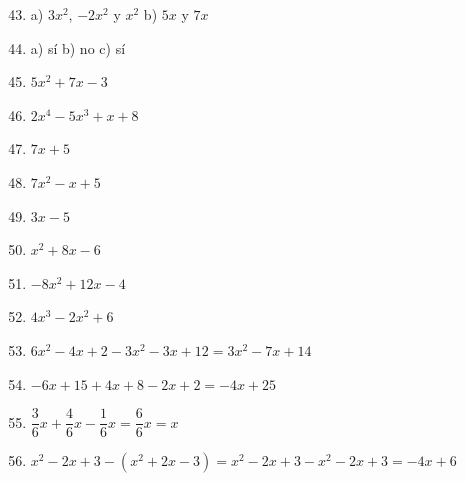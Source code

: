 \documentclass[12pt, letterpaper]{article}
\begin{document}
  \begin{enumerate}[leftmargin=*, label=\textbf{\arabic*.}]
    \setcounter{enumi}{42}
    \item a) $3x^2$, $-2x^2$ y $x^2$ \quad b) $5x$ y $7x$

    \item a) sí \quad b) no \quad c) sí

    \item $5x^2 + 7x - 3$

    \item $2x^4 - 5x^3 + x + 8$

    \item $7x + 5$

    \item $7x^2 - x + 5$

    \item $3x - 5$

    \item $x^2 + 8x - 6$

    \item $-8x^2 + 12x - 4$

    \item $4x^3 - 2x^2 + 6$

    \item $6x^2 - 4x + 2 - 3x^2 - 3x + 12 = 3x^2 - 7x + 14$

    \item $-6x + 15 + 4x + 8 - 2x + 2 = -4x + 25$

    \item $\dfrac{3}{6}x + \dfrac{4}{6}x - \dfrac{1}{6}x = \dfrac{6}{6}x = x$

    \item $x^2 - 2x + 3 - (x^2 + 2x - 3) = x^2 - 2x + 3 - x^2 - 2x + 3 = -4x + 6$
  \end{enumerate}

\fi
\end{document}
